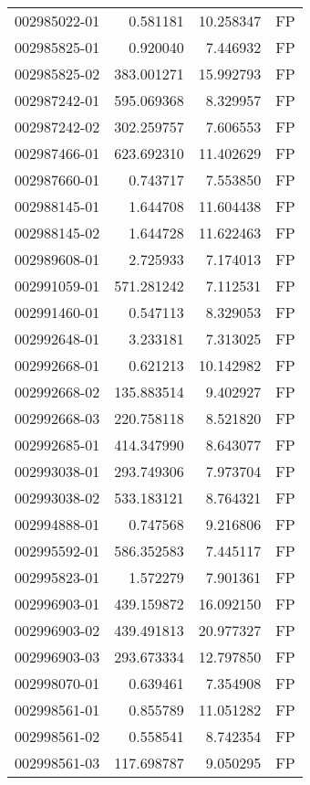 \begin{tabular}{lrrl}
002985022-01 &    0.581181 &    10.258347 &   FP \\
002985825-01 &    0.920040 &     7.446932 &   FP \\
002985825-02 &  383.001271 &    15.992793 &   FP \\
002987242-01 &  595.069368 &     8.329957 &   FP \\
002987242-02 &  302.259757 &     7.606553 &   FP \\
002987466-01 &  623.692310 &    11.402629 &   FP \\
002987660-01 &    0.743717 &     7.553850 &   FP \\
002988145-01 &    1.644708 &    11.604438 &   FP \\
002988145-02 &    1.644728 &    11.622463 &   FP \\
002989608-01 &    2.725933 &     7.174013 &   FP \\
002991059-01 &  571.281242 &     7.112531 &   FP \\
002991460-01 &    0.547113 &     8.329053 &   FP \\
002992648-01 &    3.233181 &     7.313025 &   FP \\
002992668-01 &    0.621213 &    10.142982 &   FP \\
002992668-02 &  135.883514 &     9.402927 &   FP \\
002992668-03 &  220.758118 &     8.521820 &   FP \\
002992685-01 &  414.347990 &     8.643077 &   FP \\
002993038-01 &  293.749306 &     7.973704 &   FP \\
002993038-02 &  533.183121 &     8.764321 &   FP \\
002994888-01 &    0.747568 &     9.216806 &   FP \\
002995592-01 &  586.352583 &     7.445117 &   FP \\
002995823-01 &    1.572279 &     7.901361 &   FP \\
002996903-01 &  439.159872 &    16.092150 &   FP \\
002996903-02 &  439.491813 &    20.977327 &   FP \\
002996903-03 &  293.673334 &    12.797850 &   FP \\
002998070-01 &    0.639461 &     7.354908 &   FP \\
002998561-01 &    0.855789 &    11.051282 &   FP \\
002998561-02 &    0.558541 &     8.742354 &   FP \\
002998561-03 &  117.698787 &     9.050295 &   FP \\

\end{tabular}

